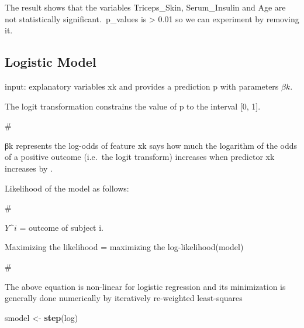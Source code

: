 \documentclass[
]{article}
\newenvironment{Shaded}{\begin{snugshade}}{\end{snugshade}}
\newcommand{\FunctionTok}[1]{\textcolor[rgb]{0.13,0.29,0.53}{\textbf{#1}}}
\newcommand{\NormalTok}[1]{#1}
\newcommand{\OtherTok}[1]{\textcolor[rgb]{0.56,0.35,0.01}{#1}}
\begin{document}
The result shows that the variables Triceps\_Skin, Serum\_Insulin and
Age are not statistically significant.~p\_values is \textgreater{} 0.01
so we can experiment by removing it.

\hypertarget{logistic-model}{%
\subsection{\texorpdfstring{\textbf{Logistic
Model}}{Logistic Model}}\label{logistic-model}}

input: explanatory variables xk and provides a prediction p with
parameters \(βk\).

The logit transformation constrains the value of p to the interval {[}0,
1{]}.

\#

βk represents the log-odds of feature xk says how much the logarithm of
the odds of a positive outcome (i.e.~the logit transform) increases when
predictor xk increases by .

Likelihood of the model as follows:

\#

\(Y\^i\) = outcome of subject i.

Maximizing the likelihood = maximizing the log-likelihood(model)

\#

The above equation is non-linear for logistic regression and its
minimization is generally done numerically by iteratively re-weighted
least-squares

\begin{Shaded}
\begin{Highlighting}[]
\NormalTok{smodel }\OtherTok{\textless{}{-}} \FunctionTok{step}\NormalTok{(log)}
\end{Highlighting}
\end{Shaded}
\end{document}
